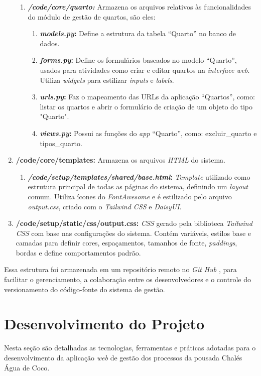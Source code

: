 \documentclass[
	12pt,				%
	openany,			%
	twoside,			%
	a4paper,			%
	english,			%
	french,				%
	spanish,			%
	brazil				%
	]{abntex2}
\begin{document}
\begin{enumerate}
\begin{enumerate}
		\item \textbf{\textit{/code/core/quarto:}} Armazena os arquivos relativos às funcionalidades do módulo de gestão de quartos, são eles:
		\begin{enumerate}
			\item \textbf{\textit{models.py}:} Define a estrutura da tabela “Quarto” no banco de dados.
			\item \textbf{\textit{forms.py}:} Define os formulários baseados no modelo “Quarto”, usados para atividades como criar e editar quartos na \textit{interface web}. Utiliza \textit{widgets} para estilizar \textit{inputs} e \textit{labels}.
			\item \textbf{\textit{urls.py}:} Faz o mapeamento das URLs da aplicação “Quartos”, como: listar os quartos e abrir o formulário de criação de um objeto do tipo "Quarto".
			\item \textbf{\textit{views.py}:} Possui as funções do \textit{app} “Quarto”, como: excluir\_quarto e tipos\_quarto.
		\end{enumerate}
	\end{enumerate}
	
	\item \textbf{/code/core/templates:} Armazena os arquivos \textit{HTML} do sistema.
	\begin{enumerate}
		\item \textbf{\textit{/code/setup/templates/shared/base.html}:} \textit{Template} utilizado como estrutura principal de todas as páginas do sistema, definindo um \textit{layout} comum. Utiliza ícones do \textit{FontAwesome} e é estilizado pelo arquivo \textit{output.css}, criado com o \textit{Tailwind CSS} e \textit{DaisyUI}.
	\end{enumerate}
	
	\item \textbf{/code/setup/static/css/output.css:} \textit{CSS} gerado pela biblioteca \textit{Tailwind CSS} com base nas configurações do sistema. Contém variáveis, estilos base e camadas para definir cores, espaçamentos, tamanhos de fonte, \textit{paddings}, bordas e define comportamentos padrão.
\end{enumerate}

Essa estrutura foi armazenada em um repositório remoto no \textit{Git Hub} \cite{repositorio}, para facilitar o gerenciamento, a colaboração entre os desenvolvedores e o controle do versionamento do código-fonte do sistema de gestão. 
\chapter{Desenvolvimento do Projeto}
Nesta seção são detalhadas as tecnologias, ferramentas e práticas adotadas para o desenvolvimento da aplicação \textit{web} de gestão dos processos da pousada Chalés Água de Coco.
\end{document}
